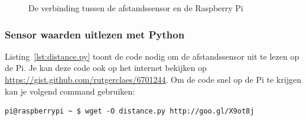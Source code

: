 \documentclass[a4paper]{article}
\begin{document}
\begin{figure}[h!]
  \centering
{}
\caption{De verbinding tussen de afstandssensor en de Raspberry Pi}
\label{fig:sensor}
\end{figure}
  
    \subsubsection{Sensor waarden uitlezen met Python}

    Listing~\ref{lst:distance.py} toont de code nodig om de
afstandssensor uit te lezen op de Pi.  Je kan deze code ook op het
internet bekijken op \url{https://gist.github.com/rutgerclaes/6701244}.  
Om de code snel op de Pi te krijgen kan je volgend command gebruiken:

\begin{lstlisting}
pi@raspberrypi ~ $ wget -O distance.py http://goo.gl/X9ot8j
\end{lstlisting}


\end{document}
